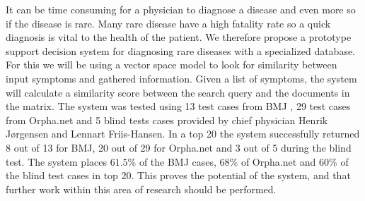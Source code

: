 It can be time consuming for a physician to diagnose a disease and
even more so if the disease is rare. Many rare disease have a high
fatality rate so a quick diagnosis is vital to the health of the
patient. We therefore propose a prototype support decision system for
diagnosing rare diseases with a specialized database. For this we will
be using a vector space model to look for similarity between input
symptoms and gathered information. Given a list of symptoms, the
system will calculate a similarity score between the search query and
the documents in the matrix. The system was tested using 13 test cases
from BMJ \cite{HangwiTang11102006}, 29 test cases from Orpha.net and 5
blind tests cases provided by chief physician Henrik J\o rgensen and
Lennart Friis-Hansen. In a top 20 the system successfully returned 8
out of 13 for BMJ, 20 out of 29 for Orpha.net and 3 out of 5 during
the blind test. The system places $61.5\%$ of the BMJ cases, $68\%$ of
Orpha.net and $60\%$ of the blind test cases in top 20. This proves the
potential of the system, and that further work within this area of
research should be performed.
